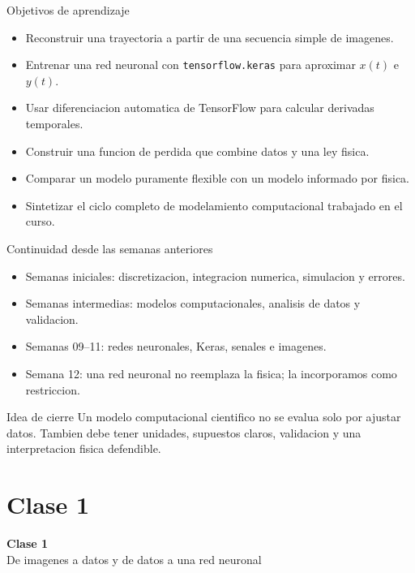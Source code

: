 \begin{frame}{Objetivos de aprendizaje}
\begin{itemize}
    \item Reconstruir una trayectoria a partir de una secuencia simple de imagenes.
    \item Entrenar una red neuronal con \texttt{tensorflow.keras} para aproximar $x(t)$ e $y(t)$.
    \item Usar diferenciacion automatica de TensorFlow para calcular derivadas temporales.
    \item Construir una funcion de perdida que combine datos y una ley fisica.
    \item Comparar un modelo puramente flexible con un modelo informado por fisica.
    \item Sintetizar el ciclo completo de modelamiento computacional trabajado en el curso.
\end{itemize}
\end{frame}

\begin{frame}{Continuidad desde las semanas anteriores}
\begin{itemize}
    \item Semanas iniciales: discretizacion, integracion numerica, simulacion y errores.
    \item Semanas intermedias: modelos computacionales, analisis de datos y validacion.
    \item Semanas 09--11: redes neuronales, Keras, senales e imagenes.
    \item Semana 12: una red neuronal no reemplaza la fisica; la incorporamos como restriccion.
\end{itemize}
\begin{alertblock}{Idea de cierre}
Un modelo computacional cientifico no se evalua solo por ajustar datos. Tambien debe tener unidades, supuestos claros, validacion y una interpretacion fisica defendible.
\end{alertblock}
\end{frame}

\section{Clase 1}

\begin{frame}[plain]
\centering
\vfill
{\Huge \bfseries Clase 1}\\[0.4cm]
{\Large De imagenes a datos y de datos a una red neuronal}
\vfill
\end{frame}


